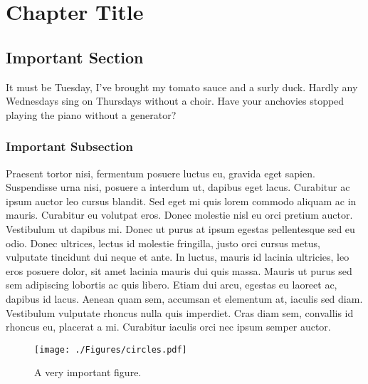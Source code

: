 
\chapter{Chapter Title} %

\label{Chapter1} %



\section{Important Section}
It must be Tuesday, I've brought my tomato sauce and a surly duck.
Hardly any Wednesdays sing on Thursdays without a choir.
Have your anchovies stopped playing the piano without a generator?


\subsection{Important Subsection}

Praesent tortor nisi, fermentum posuere luctus eu, gravida eget sapien. Suspendisse urna nisi, posuere a interdum ut, dapibus eget lacus. Curabitur ac ipsum auctor leo cursus blandit. Sed eget mi quis lorem commodo aliquam ac in mauris. Curabitur eu volutpat eros. Donec molestie nisl eu orci pretium auctor. Vestibulum ut dapibus mi. Donec ut purus at ipsum egestas pellentesque sed eu odio. Donec ultrices, lectus id molestie fringilla, justo orci cursus metus, vulputate tincidunt dui neque et ante. In luctus, mauris id lacinia ultricies, leo eros posuere dolor, sit amet lacinia mauris dui quis massa. Mauris ut purus sed sem adipiscing lobortis ac quis libero. Etiam dui arcu, egestas eu laoreet ac, dapibus id lacus. Aenean quam sem, accumsan et elementum at, iaculis sed diam. Vestibulum vulputate rhoncus nulla quis imperdiet. Cras diam sem, convallis id rhoncus eu, placerat a mi. Curabitur iaculis orci nec ipsum semper auctor.

\begin{figure}[!h]
	\centering
		\texttt{[image: ./Figures/circles.pdf]}
	\caption[Circles clashing.]{A very important figure.}
	\label{fig:circlesClashing}
\end{figure}

